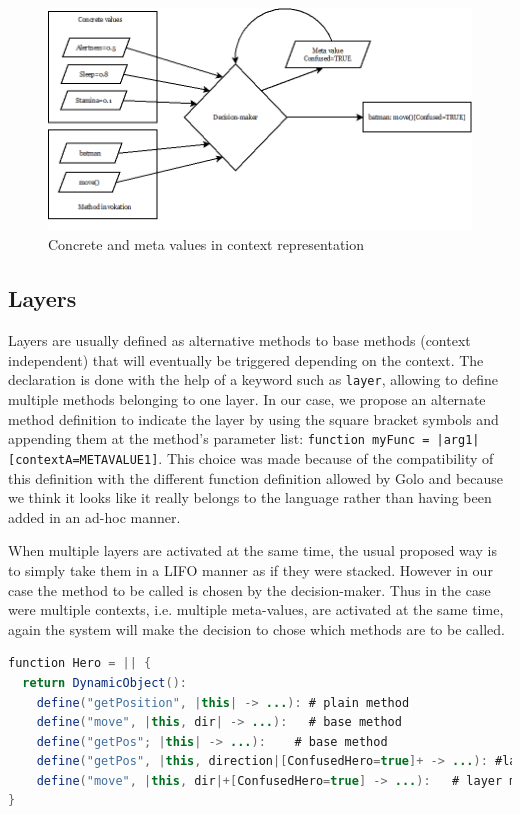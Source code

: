 \documentclass[a4paper]{article}
\begin{document}
\begin{center}
\begin{figure}
\centering
\includegraphics[width=0.9\columnwidth]{images/concrete-meta-values.png}
\caption{Concrete and meta values in context representation}
\label{figure:concretemetavalues}
\end{figure}
\end{center}

\subsection{Layers}
\label{subsection:layers}
Layers are usually defined as alternative methods to base methods (context independent) that will eventually be triggered depending on the context. The declaration is done with the help of a keyword such as \lstinline|layer|, allowing to define multiple methods belonging to one layer. In our case, we propose an alternate method definition to indicate the layer by using the square bracket symbols and appending them at the method's parameter list: \lstinline!function myFunc = |arg1|[contextA=METAVALUE1]!. This choice was made because of the compatibility of this definition with the different function definition allowed by Golo and because we think it looks like it really belongs to the language rather than having been added in an ad-hoc manner.

When multiple layers are activated at the same time, the usual proposed way is to simply take them in a LIFO manner as if they were stacked. However in our case the method to be called is chosen by the decision-maker. Thus in the case were multiple contexts, i.e. multiple meta-values, are activated at the same time, again the system will make the decision to chose which methods are to be called.

\begin{lstlisting}[float, language=Java, caption=ConGolo layers example, label={listing:congololayers}]
function Hero = || {
  return DynamicObject():
    define("getPosition", |this| -> ...): # plain method
    define("move", |this, dir| -> ...):   # base method
    define("getPos"; |this| -> ...):    # base method
    define("getPos", |this, direction|[ConfusedHero=true]+ -> ...): #layer declaration, invoked before base method
    define("move", |this, dir|+[ConfusedHero=true] -> ...):   # layer method, invoked after base method
}
\end{lstlisting}
\end{document}
